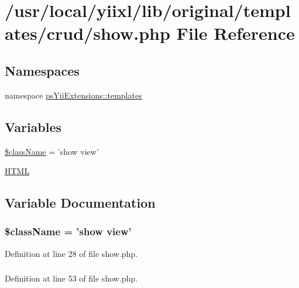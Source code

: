 \hypertarget{show_8php}{
\section{/usr/local/yiixl/lib/original/templates/crud/show.php File Reference}
\label{show_8php}
}
\subsection*{Namespaces}
\begin{DoxyCompactItemize}
\item 
namespace \hyperlink{namespacepsYiiExtensions_1_1templates}{psYiiExtensions::templates}
\end{DoxyCompactItemize}
\subsection*{Variables}
\begin{DoxyCompactItemize}
\item 
\hyperlink{show_8php_acd6a475a6eeb092f4eea3e19e502d67d}{\$className} = 'show view'
\item 
\hyperlink{show_8php_a2c8135527015cd4586959ac7c2ffec92}{HTML}
\end{DoxyCompactItemize}


\subsection{Variable Documentation}
\hypertarget{show_8php_acd6a475a6eeb092f4eea3e19e502d67d}{
\subsubsection[{\$className}]{\setlength{\rightskip}{0pt plus 5cm}\$className = 'show view'}}
\label{show_8php_acd6a475a6eeb092f4eea3e19e502d67d}


Definition at line 28 of file show.php.

\hypertarget{show_8php_a2c8135527015cd4586959ac7c2ffec92}{
\subsubsection[{HTML}]{}}
\label{show_8php_a2c8135527015cd4586959ac7c2ffec92}


Definition at line 53 of file show.php.


